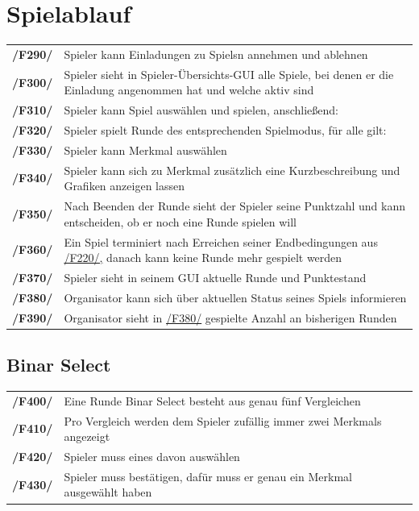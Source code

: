 \documentclass[a4paper]{scrreprt}
\begin{document}
    \section{Spielablauf} 
    \begin{tabularx}{\linewidth}{@{}>{\bfseries}l@{\hspace{.5em}}X@{}}
    \hypertarget{F290}{/F290/} & \Gls{Spieler} kann Einladungen zu \Glspl{Spiel}n annehmen und ablehnen \\
    \hypertarget{F300}{/F300/} & \Gls{Spieler} sieht in Spieler-Übersichts-GUI alle Spiele, bei denen er die Einladung angenommen hat und welche aktiv sind \\
    \hypertarget{F310}{/F310/} & \Gls{Spieler} kann \Gls{Spiel} auswählen und spielen, anschließend: \\
    \hypertarget{F320}{/F320/} & \Gls{Spieler} spielt Runde des entsprechenden \Gls{Spielmodus}, für alle gilt: \\
    \hypertarget{F330}{/F330/} & \Gls{Spieler} kann \Gls{Merkmal} auswählen \\
    \hypertarget{F340}{/F340/} & \Gls{Spieler} kann sich zu \Gls{Merkmal} zusätzlich eine Kurzbeschreibung und Grafiken anzeigen lassen \\
    \hypertarget{F350}{/F350/} & Nach Beenden der Runde sieht der \Gls{Spieler} seine Punktzahl und kann entscheiden, ob er noch eine Runde spielen will \\
	\hypertarget{F360}{/F360/} & Ein \Gls{Spiel} terminiert nach Erreichen seiner Endbedingungen aus \hyperlink{F220}{/F220/,} danach kann keine Runde mehr gespielt werden \\
    \hypertarget{F370}{/F370/} & \Gls{Spieler} sieht in seinem GUI aktuelle Runde und Punktestand \\
	\hypertarget{F380}{/F380/} & \Gls{Organisator} kann sich über aktuellen Status seines \Gls{Spiel}s informieren \\ %
    \hypertarget{F390}{/F390/} & \Gls{Organisator} sieht in \hyperlink{F380}{/F380/} gespielte Anzahl an bisherigen Runden
    \end{tabularx}
    
    \subsection{\Gls{Binar Select}}
    \begin{tabularx}{\linewidth}{@{}>{\bfseries}l@{\hspace{.5em}}X@{}}
        \hypertarget{F400}{/F400/} & Eine Runde \Gls{Binar Select} besteht aus genau fünf Vergleichen \\
    	\hypertarget{F410}{/F410/} & Pro Vergleich werden dem \Gls{Spieler} zufällig immer zwei \Glspl{Merkmal} angezeigt \\
    	\hypertarget{F420}{/F420/} & \Gls{Spieler} muss eines davon auswählen \\
    	\hypertarget{F430}{/F430/} & \Gls{Spieler} muss bestätigen, dafür muss er genau ein \Gls{Merkmal} ausgewählt haben \\
    \end{tabularx}
\end{document}
